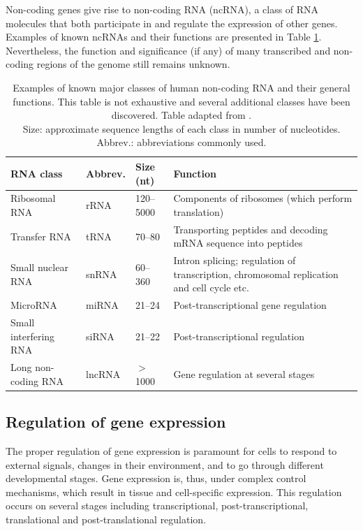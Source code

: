 Non-coding genes give rise to non-coding RNA (ncRNA), a class of RNA molecules
that both participate in and regulate the expression of other genes.
Examples of known ncRNAs and their functions are presented in Table
\ref{table:rnas}. Nevertheless, the function and significance (if any) of many
transcribed and non-coding regions of the genome still remains unknown.

\begin{table}
  \caption{Examples of known major classes of human non-coding RNA and their
  general functions. This table is not exhaustive and several additional classes have
  been discovered. Table adapted from \citep{Strachan2011}. \\
  Size: approximate sequence lengths of each class in number of nucleotides.
  Abbrev.: abbreviations commonly used.}
  \label{table:rnas}
  \centering
  {\fontsize{10pt}{12pt}\selectfont
  \begin{tabular}{ lllp{6cm} }
    \hline
    \textbf{RNA class} & \textbf{Abbrev.} & \textbf{Size (nt)} & \textbf{Function} \\
    \hline
    Ribosomal RNA         & rRNA   & 120--5000  & Components of ribosomes (which perform translation) \\
    Transfer RNA          & tRNA   & 70--80     & Transporting peptides and decoding mRNA sequence into peptides \\
    Small nuclear RNA     & snRNA  & 60--360    & Intron splicing; regulation of transcription, chromosomal replication and cell cycle etc.  \\
    MicroRNA              & miRNA  & 21--24     & Post-transcriptional gene regulation \\
    Small interfering RNA & siRNA  & 21--22     & Post-transcriptional regulation \\
    Long non-coding RNA   & lncRNA & $>$ 1000   & Gene regulation at several stages \\
    \hline
  \end{tabular}
  }
\end{table}




\subsection{Regulation of gene expression}\label{regulation-of-gene-expression}

The proper regulation of gene expression is paramount for cells to respond to
external signals, changes in their environment, and to go through different
developmental stages. Gene expression is, thus, under complex control mechanisms,
which result in tissue and cell-specific expression. This regulation
occurs on several stages including transcriptional, post-transcriptional,
translational and post-translational regulation. \citep{Strachan2011}

